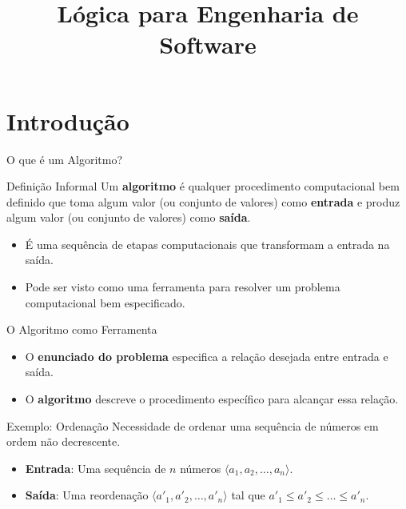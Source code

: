 \documentclass[9pt]{beamer}
\title[Presentation]{Lógica para Engenharia de Software} %
\institute[UniRV]{\textbf{\large  \textcolor{structure}{\textbf{\large
Introdução à Análise de Algoritmos
}}} %
\\ \qquad
\\Professor: Me. Sergio Souza Novak 
\\Faculdade de Engenharia de Software}
\date{}
\begin{document}
\begin{frame}
\titlepage
\end{frame}

\section{Introdução}

\begin{frame}{O que é um Algoritmo?}
    \begin{block}{Definição Informal}
        Um \textbf{algoritmo} é qualquer procedimento computacional bem definido que toma algum valor (ou conjunto de valores) como \textbf{entrada} e produz algum valor (ou conjunto de valores) como \textbf{saída}.
    \end{block}
    \vspace{0.3cm}
    \begin{itemize}
        \item É uma sequência de etapas computacionais que transformam a entrada na saída.
        \item Pode ser visto como uma ferramenta para resolver um problema computacional bem especificado.
    \end{itemize}
    \begin{center}
    \end{center}
\end{frame}

\begin{frame}{O Algoritmo como Ferramenta}
    \begin{itemize}
        \item O \textbf{enunciado do problema} especifica a relação desejada entre entrada e saída.
        \item O \textbf{algoritmo} descreve o procedimento específico para alcançar essa relação.
    \end{itemize}
    \vspace{0.3cm}
    \begin{exampleblock}{Exemplo: Ordenação}
        Necessidade de ordenar uma sequência de números em ordem não decrescente.
        \begin{itemize}
            \item \textbf{Entrada}: Uma sequência de $n$ números $\langle a_1, a_2, \dots, a_n \rangle$.
            \item \textbf{Saída}: Uma reordenação $\langle a'_1, a'_2, \dots, a'_n \rangle$ tal que $a'_1 \leq a'_2 \leq \dots \leq a'_n$.
        \end{itemize}
    \end{exampleblock}
\end{frame}
\end{document}
